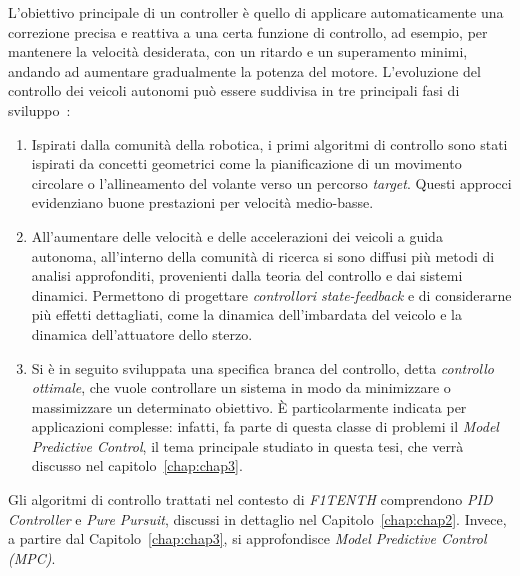 L'obiettivo principale di un controller è quello di applicare automaticamente una 
correzione precisa e reattiva a una certa funzione di controllo, ad esempio, per mantenere
la velocità desiderata, con un ritardo e un superamento minimi, andando ad aumentare gradualmente la potenza del motore.
L’evoluzione del controllo dei veicoli autonomi può essere suddivisa in tre principali fasi di sviluppo~\cite{lect08control}:
\begin{enumerate}
    \item Ispirati dalla comunità della robotica, i primi algoritmi
    di controllo sono stati ispirati da concetti geometrici come la pianificazione di un 
    movimento circolare o l'allineamento del volante verso un percorso \textit{target}. 
    Questi approcci evidenziano buone prestazioni per velocità medio-basse.
    \item All'aumentare delle velocità e delle accelerazioni dei veicoli 
    a guida autonoma, all'interno della comunità di ricerca si sono diffusi più metodi
    di analisi approfonditi, provenienti dalla teoria del controllo e dai sistemi dinamici. 
    Permettono di progettare \textit{controllori state-feedback} e di considerarne più
    effetti dettagliati, come la dinamica dell'imbardata del veicolo e la dinamica dell'attuatore dello sterzo.
    \item Si è in seguito sviluppata una specifica branca del controllo, detta 
    \textit{controllo ottimale}, che vuole controllare un sistema in modo da minimizzare
    o massimizzare un determinato obiettivo. È particolarmente indicata per
    applicazioni complesse: infatti, fa parte di questa classe di problemi il 
    \textit{Model Predictive Control}, il tema principale studiato in questa tesi,
    che verrà discusso nel capitolo~\ref{chap:chap3}.
\end{enumerate}
Gli algoritmi di controllo trattati nel contesto di \textit{F1TENTH} comprendono 
\textit{PID Controller} e \textit{Pure Pursuit}, discussi in dettaglio nel 
Capitolo~\ref{chap:chap2}. Invece, a partire dal Capitolo~\ref{chap:chap3}, si approfondisce
\textit{Model Predictive Control (MPC)}.